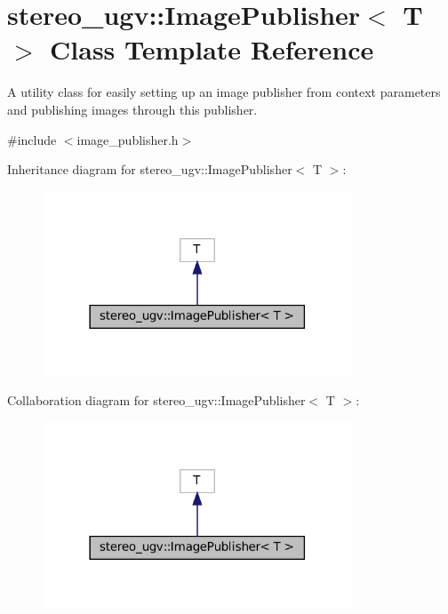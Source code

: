 \hypertarget{classstereo__ugv_1_1ImagePublisher}{}\section{stereo\+\_\+ugv\+:\+:Image\+Publisher$<$ T $>$ Class Template Reference}
\label{classstereo__ugv_1_1ImagePublisher}


A utility class for easily setting up an image publisher from context parameters and publishing images through this publisher.  




{\ttfamily \#include $<$image\+\_\+publisher.\+h$>$}



Inheritance diagram for stereo\+\_\+ugv\+:\+:Image\+Publisher$<$ T $>$\+:\nopagebreak
\begin{figure}[H]
\begin{center}
\leavevmode
\includegraphics[width=261pt]{classstereo__ugv_1_1ImagePublisher__inherit__graph}
\end{center}
\end{figure}


Collaboration diagram for stereo\+\_\+ugv\+:\+:Image\+Publisher$<$ T $>$\+:\nopagebreak
\begin{figure}[H]
\begin{center}
\leavevmode
\includegraphics[width=261pt]{classstereo__ugv_1_1ImagePublisher__coll__graph}
\end{center}
\end{figure}
